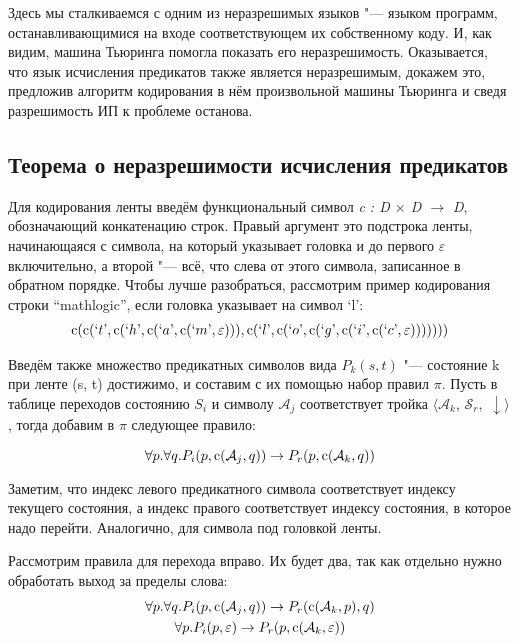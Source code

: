 Здесь мы сталкиваемся с одним из неразрешимых языков "--- языком программ, останавливающимися на входе
соответствующем их собственному коду. И, как видим, машина Тьюринга помогла показать его неразрешимость.
Оказывается, что язык исчисления предикатов также является неразрешимым, докажем это, предложив алгоритм
кодирования в нём произвольной машины Тьюринга и сведя разрешимость ИП к проблеме останова.

\subsection{Теорема о неразрешимости исчисления предикатов}

Для кодирования ленты введём функциональный символ \textit{c : D $\times$ D $\rightarrow$ D}, обозначающий
конкатенацию строк. Правый аргумент это подстрока ленты, начинающаяся с символа, на который указывает
головка и до первого $\varepsilon$ включительно, а второй "--- всё, что слева от этого символа, записанное
в обратном порядке. Чтобы лучше разобраться, рассмотрим пример кодирования строки ``mathlogic'', если
головка указывает на символ `l':
\begin{gather*}
     \operatorname{c}(\operatorname{c}(`t\text{'}, \operatorname{c}(`h\text{'}, \operatorname{c}(`a\text{'}, \operatorname{c}(`m\text{'}, \varepsilon))), \operatorname{c}(`l\text{'}, \operatorname{c}(`o\text{'}, \operatorname{c}(`g\text{'}, \operatorname{c}(`i\text{'}, \operatorname{c}(`c\text{'}, \varepsilon))))))) 
\end{gather*}

Введём также множество предикатных символов вида $P_k(s, t)$ "--- состояние k при ленте (s, t) достижимо,
и составим с их помощью набор правил $\pi$. Пусть в таблице переходов состоянию $S_i$ и символу
$\mathcal{A}_j$ соответствует тройка $\langle\mathcal{A}_k$,  $\mathcal{S}_r,$ $\downarrow\rangle$, тогда
добавим в $\pi$ следующее правило:

\[\forall p.\forall q.P_i(p, \operatorname{c}(\mathcal{A}_j, q))\to P_r(p, \operatorname{c}(\mathcal{A}_k, q))\]

Заметим, что индекс левого предикатного символа соответствует индексу текущего состояния, а индекс
правого соответствует индексу состояния, в которое надо перейти. Аналогично, для символа под головкой
ленты.

Рассмотрим правила для перехода вправо. Их будет два, так как отдельно нужно обработать
выход за пределы слова:
\begin{gather}
    \forall p.\forall q.P_i(p, \operatorname{c}(\mathcal{A}_j, q))\to P_r(\operatorname{c}(\mathcal{A}_k, p), q) \\
    \forall p.P_i(p, \varepsilon)\to P_r(p, \operatorname{c}(\mathcal{A}_k, \varepsilon))
\end{gather}


